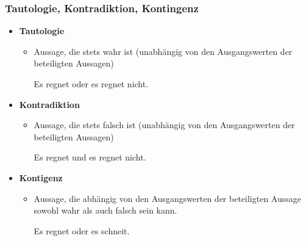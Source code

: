 
\begin{frame}
\frametitle{Tautologie, Kontradiktion, Kontingenz}

\begin{itemize}
	\item \textbf{Tautologie}
	
	\begin{itemize}
		\item Aussage, die stets wahr ist (unabhängig von den
Ausgangswerten der beteiligten Aussagen)
		
		\ea Es regnet oder es regnet nicht.
		\z
		
	\end{itemize}
	
	\item \textbf{Kontradiktion}
	
	\begin{itemize}
		\item  Aussage, die stets falsch ist (unabhängig von den
Ausgangswerten der beteiligten Aussagen)

		\ea Es regnet und es regnet nicht.
		\z
		
	\end{itemize}
	
	\item \textbf{Kontigenz}
	
	\begin{itemize}
		\item Aussage, die abhängig von den Ausgangswerten der beteiligten Aussage sowohl wahr als auch falsch sein kann.

		\ea Es regnet oder es schneit.
		\z

	\end{itemize}
	
\end{itemize}


\end{frame}



